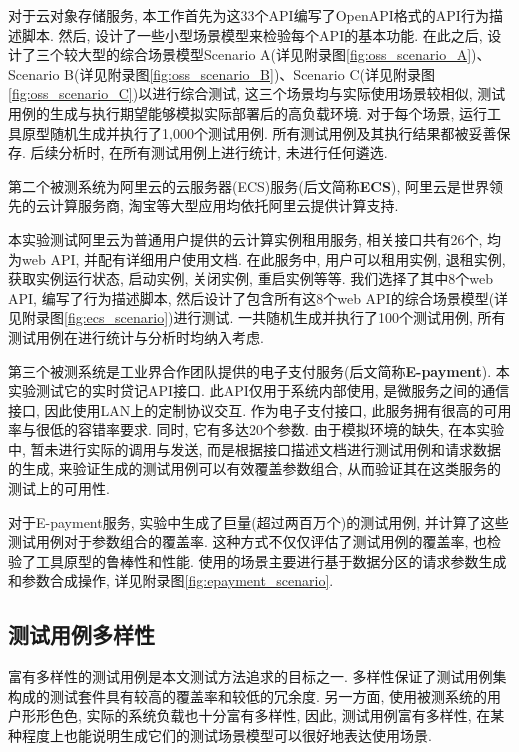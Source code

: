             对于云对象存储服务, 本工作首先为这33个API编写了OpenAPI格式的API行为描述脚本. 然后, 设计了一些小型场景模型来检验每个API的基本功能. 在此之后, 设计了三个较大型的综合场景模型Scenario A(详见附录图\ref{fig:oss_scenario_A})、Scenario B(详见附录图\ref{fig:oss_scenario_B})、Scenario C(详见附录图\ref{fig:oss_scenario_C})以进行综合测试, 这三个场景均与实际使用场景较相似, 测试用例的生成与执行期望能够模拟实际部署后的高负载环境. 对于每个场景, 运行工具原型随机生成并执行了1,000个测试用例. 所有测试用例及其执行结果都被妥善保存. 后续分析时, 在所有测试用例上进行统计, 未进行任何遴选.
            
            第二个被测系统为阿里云的云服务器(ECS)服务(后文简称\textbf{ECS}), 阿里云是世界领先的云计算服务商, 淘宝等大型应用均依托阿里云提供计算支持. 
            
            本实验测试阿里云为普通用户提供的云计算实例租用服务, 相关接口共有26个, 均为web API, 并配有详细用户使用文档. 在此服务中, 用户可以租用实例, 退租实例, 获取实例运行状态, 启动实例, 关闭实例, 重启实例等等. 我们选择了其中8个web API, 编写了行为描述脚本, 然后设计了包含所有这8个web API的综合场景模型(详见附录图\ref{fig:ecs_scenario})进行测试. 一共随机生成并执行了100个测试用例, 所有测试用例在进行统计与分析时均纳入考虑.
            
            第三个被测系统是工业界合作团队提供的电子支付服务(后文简称\textbf{E-payment}). 本实验测试它的实时贷记API接口. 此API仅用于系统内部使用, 是微服务之间的通信接口, 因此使用LAN上的定制协议交互. 作为电子支付接口, 此服务拥有很高的可用率与很低的容错率要求. 同时, 它有多达20个参数. 由于模拟环境的缺失, 在本实验中, 暂未进行实际的调用与发送, 而是根据接口描述文档进行测试用例和请求数据的生成, 来验证生成的测试用例可以有效覆盖参数组合, 从而验证其在这类服务的测试上的可用性.
            
            对于E-payment服务, 实验中生成了巨量(超过两百万个)的测试用例, 并计算了这些测试用例对于参数组合的覆盖率. 这种方式不仅仅评估了测试用例的覆盖率, 也检验了工具原型的鲁棒性和性能. 使用的场景主要进行基于数据分区的请求参数生成和参数合成操作, 详见附录图\ref{fig:epayment_scenario}.
            
        \subsection{测试用例多样性}
            富有多样性的测试用例是本文测试方法追求的目标之一. 多样性保证了测试用例集构成的测试套件具有较高的覆盖率和较低的冗余度. 另一方面, 使用被测系统的用户形形色色, 实际的系统负载也十分富有多样性, 因此, 测试用例富有多样性, 在某种程度上也能说明生成它们的测试场景模型可以很好地表达使用场景.
            
